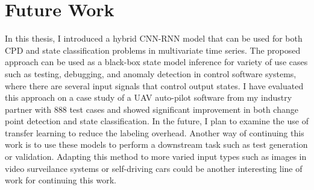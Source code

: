 \chapter{Future Work}\label{sec:future_work}
In this thesis, I introduced a hybrid CNN-RNN model that can be used for both CPD and state classification problems in multivariate time series. The proposed approach can be used as a black-box state model inference for variety of use cases such as testing, debugging, and anomaly detection in control software systems, where there are several input signals that control output states. I have evaluated this approach on a case study of a UAV auto-pilot software from my industry partner with 888 test cases and showed significant improvement in both change point detection and state classification. In the future, I plan to examine the use of transfer learning to reduce the labeling overhead. Another way of continuing this work is to use these models to perform a downstream task such as test generation or validation. Adapting this method to more varied input types such as images in video surveilance systems or self-driving cars could be another interesting line of work for continuing this work.